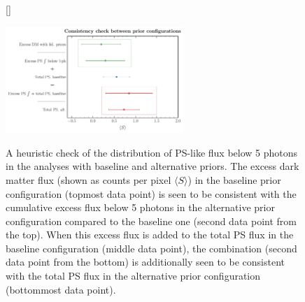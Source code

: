 \documentclass[prd,aps,10pt,nofootinbib,twocolumn,superscriptaddress,preprintnumbers,balancelastpage,longbibliography,floatfix]{revtex4-2}
\begin{document}
%
\begin{figure}[!htbp]
[\FBwidth]
{\caption{A heuristic check of the distribution of PS-like flux below 5 photons in the analyses with baseline and alternative priors. The excess dark matter flux (shown as counts per pixel $\langle S \rangle$) in the baseline prior configuration (topmost data point) is seen to be consistent with the cumulative excess flux below 5 photons in the alternative prior configuration compared to the baseline one (second data point from the top). When this excess flux is added to the total PS flux in the baseline configuration (middle data point), the combination (second data point from the bottom) is additionally seen to be consistent with the total PS flux in the alternative prior configuration (bottommost data point).}
\label{fig:consistency}}
{\includegraphics[width=0.6\textwidth]{plots/consistency_check.pdf}}
\end{figure}
%
\end{document}
